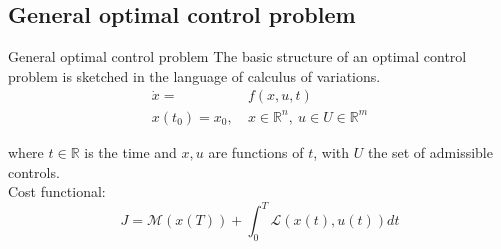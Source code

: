 
\subsection{General optimal control problem}
\begin{frame}{General optimal control problem}
	The basic structure of an optimal control problem is sketched in the language of calculus of variations.
	\begin{align}
		\dot{x} = &f(x,u,t) \label{eq:BasicOptimalFunction} \\ 
		x(t_0) = x_0, \ &x \in \mathbb{R}^n, \ u \in U \in \mathbb{R}^m \label{eq:BasicOptimalDefinitions}
	\end{align}
	
	where $t \in \mathbb{R}$ is the time and $x,u$ are functions of $t$, with $U$ the set of admissible controls. \\
	\medskip
	Cost functional:
	\begin{equation}\label{eq:BolzaProblem}
		J = \mathcal{M}(x(T)) + \int_{0}^{T} \mathcal{L}(x(t),u(t)) dt
	\end{equation} 
\end{frame}

%
%	
%	
%	

